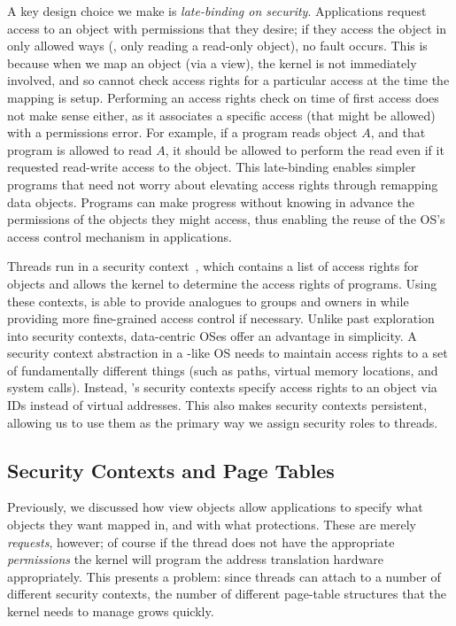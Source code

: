 A key design choice we make is \emph{late-binding on security}. Applications
request access to an object with permissions that they desire;
if they access the object in only allowed ways (\eg, only reading a read-only
object), no fault occurs.
This is because when we map an object (via a view), the kernel is not immediately involved, and so
cannot check access rights for a particular access at the time the mapping is setup. Performing an access rights check on
time of first access does not make sense either, as it associates a specific access (that
might be allowed) with a permissions error. For example, if a program reads object $A$, and that program is
allowed to read $A$, it should be allowed to perform the read even if it requested read-write access
to the object.
This late-binding enables simpler programs that need not worry about
elevating access rights through remapping data objects. Programs can make progress without
knowing in advance the permissions of the objects they might access, thus enabling the reuse of the
OS's access control mechanism in applications.

Threads run in a security context~\cite{lwc,bittau:nsdi08,elhajj:asplos16}, which
contains a list of access rights for objects and allows the kernel to determine the access rights of
programs. Using these contexts, \Twizzler is able to provide
analogues to groups and owners in \unix while providing more fine-grained access control if
necessary. Unlike past exploration into security contexts, data-centric OSes offer an
advantage in simplicity. A security context abstraction in a \unix-like OS needs to
maintain access rights to a set of fundamentally different things (such as paths, virtual memory
locations, and system calls). Instead, \Twizzler's security contexts specify access rights to an object
via IDs instead of virtual addresses.
This also makes security contexts persistent, allowing us to use them as
the primary way we assign security roles to threads.


\subsection{Security Contexts and Page Tables}
\label{sec:secimpl}
Previously, we discussed how view objects allow applications to specify what objects they
want mapped in, and with what protections. These are merely \emph{requests}, however; of course if
the thread does not have the appropriate \emph{permissions} the kernel will program the address
translation hardware appropriately. This presents a problem: since threads can attach to a number of
different security contexts, the number of different page-table structures that the kernel needs to
manage grows quickly.

